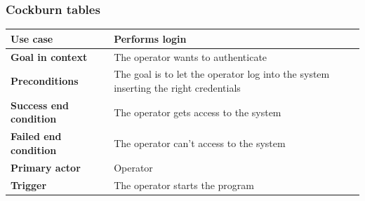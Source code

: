 {{		\subsubsection{Cockburn tables}{
			\begin{center}
			\begin{tabular}{|p{4cm}|p{10cm}|}
			\hline
				\centering \vspace{1mm} \bfseries{Use case} \vspace{1mm} & 
				\vspace{1mm} Performs login \vspace{1mm}\\
			\hline
				\centering \vspace{1mm} \bfseries{Goal in context} \vspace{1mm} & 
				\vspace{1mm} The operator wants to authenticate \vspace{1mm}\\
			\hline
				\centering \vspace{1mm} \bfseries{Preconditions} \vspace{1mm} & 
				\vspace{1mm} The goal is to let the operator log into the system inserting the right credentials \vspace{1mm}\\
			\hline
				\centering \vspace{1mm} \bfseries{Success end condition} \vspace{1mm} & 
				\vspace{1mm} The operator gets access to the system \vspace{1mm}\\
			\hline
				\centering \vspace{1mm} \bfseries{Failed end condition} \vspace{1mm} & 
				\vspace{1mm} The operator can't access to the system \vspace{1mm}\\
			\hline
				\centering \vspace{1mm} \bfseries{Primary actor} \vspace{1mm} & 
				\vspace{1mm} Operator \vspace{1mm}\\
			\hline
				\centering \vspace{1mm} \bfseries{Trigger} \vspace{1mm} & 
				\vspace{1mm} The operator starts the program \vspace{1mm}\\
			\hline
			\end{tabular}
			

\end{center}}}}
